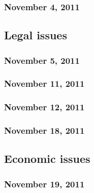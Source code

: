 \documentclass[a4paper]{article}
\begin{document}
\subsubsection{November 4, 2011}



\subsection{Legal issues}


\subsubsection{November 5, 2011}


\subsubsection{November 11, 2011}


\subsubsection{November 12, 2011}


\subsubsection{November 18, 2011}


\subsection{Economic issues}



\subsubsection{November 19, 2011}
\end{document}
